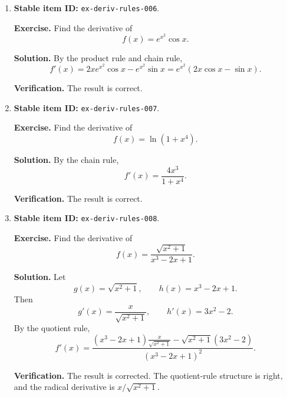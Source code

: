 \begin{enumerate}
  \textbf{Exercise.}
  Find the derivative of
  \[
    f(x) = \frac{x^2\sin x}{1+x^2}.
  \]

  \textbf{Solution.}
  Write \(f(x) = x^2 \cdot \frac{\sin x}{1+x^2}\). Then
  \[
    f'(x)
      =
      2x\frac{\sin x}{1+x^2}
      +
      x^2
      \frac{(1+x^2)\cos x - 2x\sin x}{(1+x^2)^2}.
  \]
  Combining over a common denominator gives
  \[
    f'(x)
      =
      \frac{2x\sin x + x^2(1+x^2)\cos x}{(1+x^2)^2}.
  \]

  \textbf{Verification.}
  The result is corrected and consolidated from the product/quotient split.

  \item \textbf{Stable item ID:} \texttt{ex-deriv-rules-006}.

  \textbf{Exercise.}
  Find the derivative of
  \[
    f(x) = e^{x^2}\cos x.
  \]

  \textbf{Solution.}
  By the product rule and chain rule,
  \[
    f'(x)
      =
      2xe^{x^2}\cos x - e^{x^2}\sin x
      =
      e^{x^2}(2x\cos x - \sin x).
  \]

  \textbf{Verification.}
  The result is correct.

  \item \textbf{Stable item ID:} \texttt{ex-deriv-rules-007}.

  \textbf{Exercise.}
  Find the derivative of
  \[
    f(x) = \ln(1+x^4).
  \]

  \textbf{Solution.}
  By the chain rule,
  \[
    f'(x)
      =
      \frac{4x^3}{1+x^4}.
  \]

  \textbf{Verification.}
  The result is correct.

  \item \textbf{Stable item ID:} \texttt{ex-deriv-rules-008}.

  \textbf{Exercise.}
  Find the derivative of
  \[
    f(x) = \frac{\sqrt{x^2+1}}{x^3 - 2x + 1}.
  \]

  \textbf{Solution.}
  Let
  \[
    g(x) = \sqrt{x^2+1},
    \qquad
    h(x) = x^3 - 2x + 1.
  \]
  Then
  \[
    g'(x) = \frac{x}{\sqrt{x^2+1}},
    \qquad
    h'(x) = 3x^2 - 2.
  \]
  By the quotient rule,
  \[
    f'(x)
      =
      \frac{
        (x^3 - 2x + 1)\frac{x}{\sqrt{x^2+1}}
        -
        \sqrt{x^2+1}(3x^2 - 2)
      }{(x^3 - 2x + 1)^2}.
  \]

  \textbf{Verification.}
  The result is corrected. The quotient-rule structure is right, and the
  radical derivative is \(x/\sqrt{x^2+1}\).
\end{enumerate}
